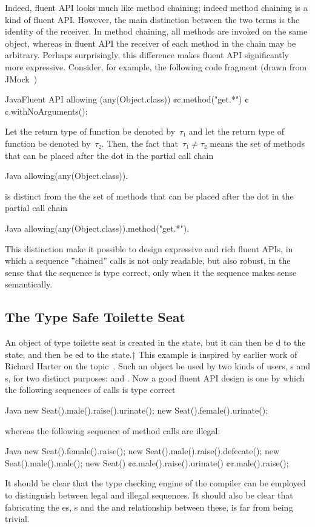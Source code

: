 Indeed, fluent API looks much like method chaining; indeed method chaining is a kind
  of fluent API{}.
However, the main distinction between the two terms is the identity of the receiver.
In method chaining, all methods are invoked on the same object, whereas in fluent API
  the receiver of each method in the chain may be arbitrary.
Perhaps surprisingly, this difference makes fluent API significantly more expressive.
Consider, for example, the following code fragment (drawn from JMock~\cite{Freeman:Pryce:06})
\begin{lCode}{Java}{Fluent API}
allowing (any(Object.class))
  ¢¢.method("get.*")
  ¢¢.withNoArguments();
\end{lCode}
Let the return type of function  be denoted by~$τ₁$ and let the return type of function  be denoted by~$τ₂$.
Then, the fact that~$τ₁≠τ₂$ means the set of methods that can be placed after the dot
in the partial call chain
\begin{lcode}{Java}
 allowing(any(Object.class)).
\end{lcode}
is distinct from the the set of methods that can be placed after the dot in the partial call chain
\begin{lcode}{Java}
allowing(any(Object.class)).method("get.*").
\end{lcode}
This distinction make it possible to design expressive and rich fluent APIs, in which a sequence ‟chained” calls is not only readable, but also
robust, in the sense that the sequence is type correct, only when it the sequence makes sense semantically.

\subsection{The Type Safe Toilette Seat}

An object of type toilette seat is created in the  state, but it can
then be d to the  state, and then be ed to the
 state.†{%
This example is inspired by earlier work of 
  Richard Harter on the topic~\cite{Harter:05}.}
Such an object be used by two kinds of users, s and s, for two distinct purposes:  and .
Now a good fluent API design is one by which the following sequences of calls is type correct
\begin{lcode}{Java}
new Seat().male().raise().urinate();
new Seat().female().urinate();
 \end{lcode}
whereas the following sequence of method calls are illegal:
\begin{lcode}{Java}
new Seat().female().raise();
new Seat().male().raise().defecate();
new Seat().male().male();
new Seat()
     ¢¢.male().raise().urinate()
     ¢¢.male().raise();
\end{lcode}
It should be clear that the type checking engine of the compiler can
be employed to distinguish between legal and illegal sequences.
It should also be clear that fabricating the es, s
and the  and  relationship between these, is
far from being trivial.

